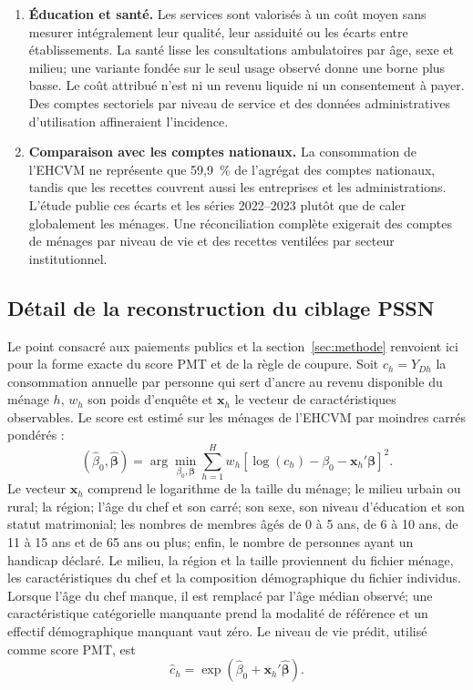 \documentclass[11pt,a4paper]{article}
\begin{document}
\begin{enumerate}
\item \textbf{Éducation et santé.} Les services sont valorisés à un coût moyen
sans mesurer intégralement leur qualité, leur assiduité ou les écarts entre
établissements. La santé lisse les consultations ambulatoires par âge, sexe et
milieu; une variante fondée sur le seul usage observé donne une borne plus
basse. Le coût attribué n'est ni un revenu liquide ni un consentement à payer.
Des comptes sectoriels par niveau de service et des données administratives
d'utilisation affineraient l'incidence.

\item \textbf{Comparaison avec les comptes nationaux.} La consommation de
l'EHCVM ne représente que 59,9~\% de l'agrégat des comptes nationaux, tandis que
les recettes couvrent aussi les entreprises et les administrations. L'étude
publie ces écarts et les séries 2022--2023 plutôt que de caler globalement les
ménages. Une réconciliation complète exigerait des comptes de ménages par
niveau de vie et des recettes ventilées par secteur institutionnel.
\end{enumerate}

\subsection{Détail de la reconstruction du ciblage PSSN}
\label{annexe:pmt}

Le point consacré aux paiements publics et la section~\ref{sec:methode}
renvoient ici pour la forme exacte du score PMT et de la règle de coupure. Soit
$c_h=Y_{Dh}$ la consommation annuelle par personne qui sert d'ancre au revenu
disponible du ménage $h$, $w_h$ son poids d'enquête et $\boldsymbol{x}_h$ le
vecteur de caractéristiques observables. Le score est estimé sur les ménages de
l'EHCVM par moindres carrés pondérés :
\begin{equation}
(\widehat{\beta}_0,\widehat{\boldsymbol{\beta}})
=\arg\min_{\beta_0,\boldsymbol{\beta}}
\sum_{h=1}^{H}w_h
\left[\log(c_h)-\beta_0-\boldsymbol{x}_h'\boldsymbol{\beta}\right]^2.
\label{eq:pmt-wls}
\end{equation}
Le vecteur $\boldsymbol{x}_h$ comprend le logarithme de la taille du ménage; le
milieu urbain ou rural; la région; l'âge du chef et son carré; son sexe, son
niveau d'éducation et son statut matrimonial; les nombres de membres âgés de 0
à 5 ans, de 6 à 10 ans, de 11 à 15 ans et de 65 ans ou plus; enfin, le nombre
de personnes ayant un handicap déclaré. Le milieu, la région et la taille
proviennent du fichier ménage, les caractéristiques du chef et la composition
démographique du fichier individus. Lorsque l'âge du chef manque, il est
remplacé par l'âge médian observé; une caractéristique catégorielle manquante
prend la modalité de référence et un effectif démographique manquant vaut zéro.
Le niveau de vie prédit, utilisé comme score PMT, est
\begin{equation}
\widehat c_h=\exp\!\left(
\widehat\beta_0+\boldsymbol{x}_h'\widehat{\boldsymbol\beta}\right).
\label{eq:pmt-score}
\end{equation}
\end{document}
